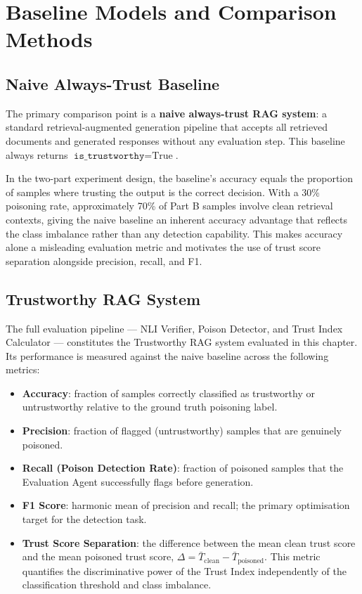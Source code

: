 \section{Baseline Models and Comparison Methods}
\label{sec:ch6_baseline}

\subsection{Naive Always-Trust Baseline}

The primary comparison point is a \textbf{naive always-trust RAG system}: a standard
retrieval-augmented generation pipeline that accepts all retrieved documents and generated
responses without any evaluation step. This baseline always returns
$\texttt{is\_trustworthy} = \text{True}$.

In the two-part experiment design, the baseline's accuracy equals the proportion of samples
where trusting the output is the correct decision. With a 30\% poisoning rate, approximately
70\% of Part B samples involve clean retrieval contexts, giving the naive baseline an inherent
accuracy advantage that reflects the class imbalance rather than any detection capability.
This makes accuracy alone a misleading evaluation metric and motivates the use of trust score
separation alongside precision, recall, and F1.

\subsection{Trustworthy RAG System}

The full evaluation pipeline --- NLI Verifier, Poison Detector, and Trust Index Calculator
--- constitutes the Trustworthy RAG system evaluated in this chapter. Its performance is
measured against the naive baseline across the following metrics:

\begin{itemize}
    \item \textbf{Accuracy}: fraction of samples correctly classified as trustworthy or
    untrustworthy relative to the ground truth poisoning label.

    \item \textbf{Precision}: fraction of flagged (untrustworthy) samples that are genuinely
    poisoned.

    \item \textbf{Recall (Poison Detection Rate)}: fraction of poisoned samples that the
    Evaluation Agent successfully flags before generation.

    \item \textbf{F1 Score}: harmonic mean of precision and recall; the primary optimisation
    target for the detection task.

    \item \textbf{Trust Score Separation}: the difference between the mean clean trust score
    and the mean poisoned trust score,
    $\Delta = \bar{T}_{\text{clean}} - \bar{T}_{\text{poisoned}}$.
    This metric quantifies the discriminative power of the Trust Index independently of the
    classification threshold and class imbalance.
\end{itemize}

